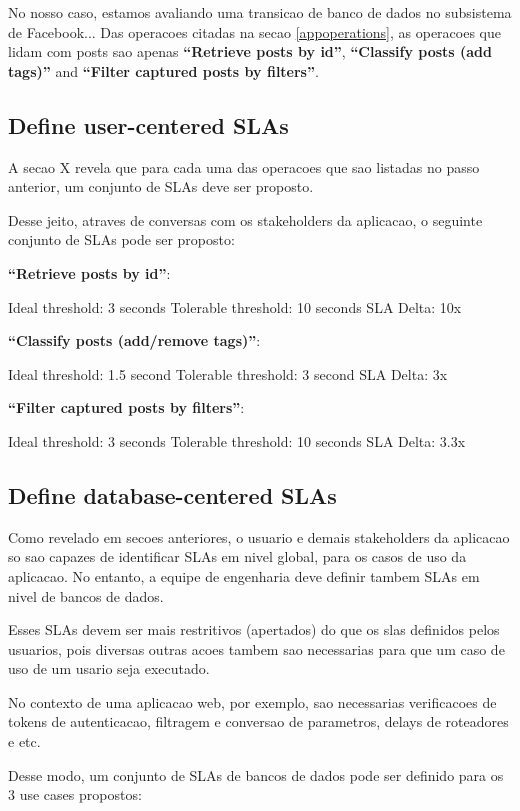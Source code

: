 No nosso caso, estamos avaliando uma transicao de banco de dados no subsistema de Facebook... Das operacoes citadas na secao \ref{appoperations}, as operacoes que lidam com posts sao apenas \textbf{``Retrieve posts by id''}, \textbf{``Classify posts (add tags)''} and \textbf{``Filter captured posts by filters''}.


\subsection{Define user-centered SLAs}

A secao X revela que para cada uma das operacoes que sao listadas no passo anterior, um conjunto de SLAs deve ser proposto. 

Desse jeito, atraves de conversas com os stakeholders da aplicacao, o seguinte conjunto de SLAs pode ser proposto: 

\textbf{``Retrieve posts by id''}:

Ideal threshold: 3 seconds
Tolerable threshold: 10 seconds
SLA Delta: 10x

\textbf{``Classify posts (add/remove tags)''}:

Ideal threshold: 1.5 second
Tolerable threshold: 3 second
SLA Delta: 3x

\textbf{``Filter captured posts by filters''}:

Ideal threshold: 3 seconds
Tolerable threshold: 10 seconds
SLA Delta: 3.3x


\subsection{Define database-centered SLAs}
Como revelado em secoes anteriores, o usuario e demais stakeholders da aplicacao so sao capazes de identificar SLAs em nivel global, para os casos de uso da aplicacao. No entanto, a equipe de engenharia deve definir tambem SLAs em nivel de bancos de dados. 

Esses SLAs devem ser mais restritivos (apertados) do que os slas definidos pelos usuarios, pois diversas outras acoes tambem sao necessarias para que um caso de uso de um usario seja executado. 

No contexto de uma aplicacao web, por exemplo, sao necessarias verificacoes de tokens de autenticacao, filtragem e conversao de parametros, delays de roteadores e etc.

Desse modo, um conjunto de SLAs de bancos de dados pode ser definido para os 3 use cases propostos: 


